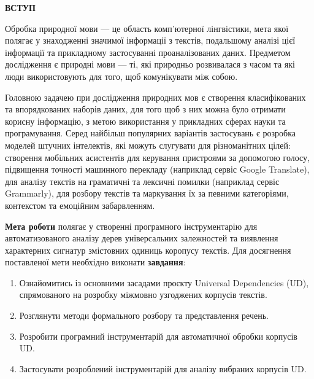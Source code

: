 \thispagestyle{empty}

\begin{center}
\textbf{\Large ВСТУП}
\end{center}

Обробка природної мови --- це область комп’ютерної лінгвістики, мета якої
полягає у знаходженні значимої інформації з текстів, подальшому аналізі цієї
інформації та прикладному застосуванні проаналізованих даних. Предметом
дослідження є природні мови --- ті, які природньо розвивалася з часом та які люди
використовують для того, щоб комунікувати між собою.

Головною задачею при дослідження природних мов є створення класифікованих
та впорядкованих наборів даних, для того щоб з них можна було отримати
корисну інформацію, з метою використання у прикладних сферах науки та програмування.
Серед найбільш популярних варіантів застосувань є розробка моделей штучних
інтелектів, які можуть слугувати для різноманітних цілей: створення мобільних
асистентів для керування пристроями за допомогою голосу, підвищення точності машинного перекладу (наприклад сервіс Google Translate), для аналізу текстів на
граматичні та лексичні помилки (наприклад сервіс Grammarly), для розбору текстів
та маркування їх за певними категоріями, контекстом та емоційним забарвленням.

\textbf{Мета роботи} полягає у створенні програмного інструментарію для
автоматизованого аналізу дерев універсальних залежностей та виявлення
характерних сигнатур змістовних одиниць коропусу текстів.
Для досягнення поставленої мети необхідно виконати \textbf{завдання}:

\begin{enumerate}
    \item Ознайомитись із основними засадами проєкту Universal Dependencies
    (UD), спрямованого на розробку міжмовно узгоджених корпусів текстів.
    \item Розглянути методи формального розбору та представлення речень.
    \item Розробити програмний інструментарій для автоматичної обробки корпусів
    UD.
    \item Застосувати розроблений інструментарій для аналізу вибраних корпусів UD.
\end{enumerate}